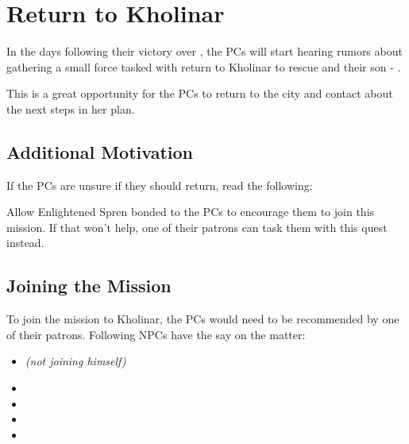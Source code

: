 \section{Return to Kholinar}
\label{sec:returnToKholinar}

In the days following their victory over \npcMidnightMotherFull{}, the PCs will start hearing rumors about \npcElhokar{} gathering a small force tasked with return to Kholinar to rescue \npcQueen{} and their son - \npcGavinor{}.

This is a great opportunity for the PCs to return to the city and contact \npcSjaAnat{} about the next steps in her plan.


\subsection{Additional Motivation}

If the PCs are unsure if they should return, read the following:


Allow Enlightened Spren bonded to the PCs to encourage them to join this mission. If that won't help, one of their patrons can task them with this quest instead.


\subsection{Joining the Mission}

To join the mission to Kholinar, the PCs would need to be recommended by one of their patrons. Following NPCs have the say on the matter:

\begin{itemize}
	\item \npcDalinar{} \textit{(not joining himself)}
	\item \npcElhokar{}
	\item \npcAdolin{}
	\item \npcShallan{}
	\item \npcKaladin{}
\end{itemize}

